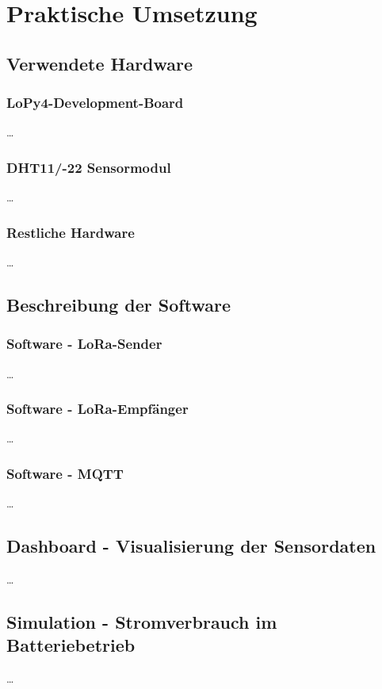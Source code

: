 
\chapter{Praktische Umsetzung} \label{Praktische Umsetzung}
\section{Verwendete Hardware} \label{Hardware}
\subsection{LoPy4-Development-Board} \label{LoPy4}

\ldots

\subsection{DHT11/-22 Sensormodul} \label{DHT}

\ldots


\subsection{Restliche Hardware} \label{Restliche Hardware}

\ldots


\section{Beschreibung der Software} \label{Software}
\subsection{Software - LoRa-Sender} \label{Sender}

\ldots

\subsection{Software - LoRa-Empfänger} \label{Empfänger}

\ldots

\subsection{Software - MQTT} \label{Software-MQTT}

\ldots


\section{Dashboard - Visualisierung der Sensordaten} \label{Dashboard und Visualisierung}

\ldots


\section{Simulation - Stromverbrauch im Batteriebetrieb} \label{Simulation}

\ldots
